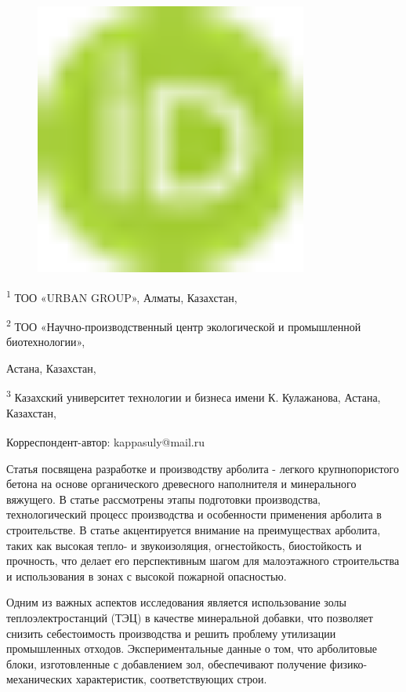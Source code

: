 \begin{figure}[H]
	\centering
	\includegraphics[width=0.8\textwidth]{media/chem2/image1}
	\caption*{}
\end{figure}


\textsuperscript{1} ТОО «URBAN GROUP», Алматы, Казахстан,

\textsuperscript{2} ТОО «Научно-производственный центр экологической и
промышленной биотехнологии»,

Астана, Казахстан,

\textsuperscript{3} Казахский университет технологии и бизнеса имени К.
Кулажанова, Астана, Казахстан,

{\bfseries \textsuperscript{\envelope }}Корреспондент-автор: kappasuly@mail.ru

Статья посвящена разработке и производству арболита - легкого
крупнопористого бетона на основе органического древесного наполнителя и
минерального вяжущего. В статье рассмотрены этапы подготовки
производства, технологический процесс производства и особенности
применения арболита в строительстве. В статье акцентируется внимание на
преимуществах арболита, таких как высокая тепло- и звукоизоляция,
огнестойкость, биостойкость и прочность, что делает его перспективным
шагом для малоэтажного строительства и использования в зонах с высокой
пожарной опасностью.

Одним из важных аспектов исследования является использование золы
теплоэлектростанций (ТЭЦ) в качестве минеральной добавки, что позволяет
снизить себестоимость производства и решить проблему утилизации
промышленных отходов. Экспериментальные данные о том, что арболитовые
блоки, изготовленные с добавлением зол, обеспечивают получение
физико-механических характеристик, соответствующих строи.

